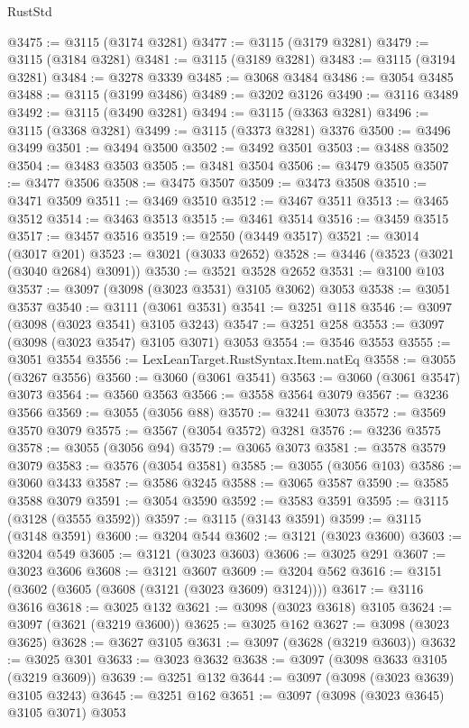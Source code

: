 \begin{lexlean}{RustStd}
\begin{coremodule}
@3475 := @3115 (@3174 @3281)
@3477 := @3115 (@3179 @3281)
@3479 := @3115 (@3184 @3281)
@3481 := @3115 (@3189 @3281)
@3483 := @3115 (@3194 @3281)
@3484 := @3278 @3339
@3485 := @3068 @3484
@3486 := @3054 @3485
@3488 := @3115 (@3199 @3486)
@3489 := @3202 @3126
@3490 := @3116 @3489
@3492 := @3115 (@3490 @3281)
@3494 := @3115 (@3363 @3281)
@3496 := @3115 (@3368 @3281)
@3499 := @3115 (@3373 @3281) @3376
@3500 := @3496 @3499
@3501 := @3494 @3500
@3502 := @3492 @3501
@3503 := @3488 @3502
@3504 := @3483 @3503
@3505 := @3481 @3504
@3506 := @3479 @3505
@3507 := @3477 @3506
@3508 := @3475 @3507
@3509 := @3473 @3508
@3510 := @3471 @3509
@3511 := @3469 @3510
@3512 := @3467 @3511
@3513 := @3465 @3512
@3514 := @3463 @3513
@3515 := @3461 @3514
@3516 := @3459 @3515
@3517 := @3457 @3516
@3519 := @2550 (@3449 @3517)
@3521 := @3014 (@3017 @201)
@3523 := @3021 (@3033 @2652)
@3528 := @3446 (@3523 (@3021 (@3040 @2684) @3091))
@3530 := @3521 @3528 @2652
@3531 := @3100 @103
@3537 := @3097 (@3098 (@3023 @3531) @3105 @3062) @3053
@3538 := @3051 @3537
@3540 := @3111 (@3061 @3531)
@3541 := @3251 @118
@3546 := @3097 (@3098 (@3023 @3541) @3105 @3243)
@3547 := @3251 @258
@3553 := @3097 (@3098 (@3023 @3547) @3105 @3071) @3053
@3554 := @3546 @3553
@3555 := @3051 @3554
@3556 := LexLeanTarget.RustSyntax.Item.natEq
@3558 := @3055 (@3267 @3556)
@3560 := @3060 (@3061 @3541)
@3563 := @3060 (@3061 @3547) @3073
@3564 := @3560 @3563
@3566 := @3558 @3564 @3079
@3567 := @3236 @3566
@3569 := @3055 (@3056 @88)
@3570 := @3241 @3073
@3572 := @3569 @3570 @3079
@3575 := @3567 (@3054 @3572) @3281
@3576 := @3236 @3575
@3578 := @3055 (@3056 @94)
@3579 := @3065 @3073
@3581 := @3578 @3579 @3079
@3583 := @3576 (@3054 @3581)
@3585 := @3055 (@3056 @103)
@3586 := @3060 @3433
@3587 := @3586 @3245
@3588 := @3065 @3587
@3590 := @3585 @3588 @3079
@3591 := @3054 @3590
@3592 := @3583 @3591
@3595 := @3115 (@3128 (@3555 @3592))
@3597 := @3115 (@3143 @3591)
@3599 := @3115 (@3148 @3591)
@3600 := @3204 @544
@3602 := @3121 (@3023 @3600)
@3603 := @3204 @549
@3605 := @3121 (@3023 @3603)
@3606 := @3025 @291
@3607 := @3023 @3606
@3608 := @3121 @3607
@3609 := @3204 @562
@3616 := @3151 (@3602 (@3605 (@3608 (@3121 (@3023 @3609) @3124))))
@3617 := @3116 @3616
@3618 := @3025 @132
@3621 := @3098 (@3023 @3618) @3105
@3624 := @3097 (@3621 (@3219 @3600))
@3625 := @3025 @162
@3627 := @3098 (@3023 @3625)
@3628 := @3627 @3105
@3631 := @3097 (@3628 (@3219 @3603))
@3632 := @3025 @301
@3633 := @3023 @3632
@3638 := @3097 (@3098 @3633 @3105 (@3219 @3609))
@3639 := @3251 @132
@3644 := @3097 (@3098 (@3023 @3639) @3105 @3243)
@3645 := @3251 @162
@3651 := @3097 (@3098 (@3023 @3645) @3105 @3071) @3053

\end{coremodule}
\end{lexlean}
